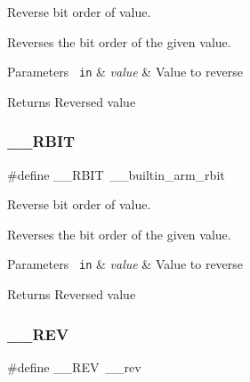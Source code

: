 Reverse bit order of value. 

Reverses the bit order of the given value. 
\begin{DoxyParams}[1]{Parameters}
\mbox{\texttt{ in}}  & {\em value} & Value to reverse \\
\hline
\end{DoxyParams}
\begin{DoxyReturn}{Returns}
Reversed value 
\end{DoxyReturn}
\mbox{\label{group___c_m_s_i_s___core___instruction_interface_gab83768933a612816fad669db5488366f}} 
\subsubsection{\texorpdfstring{\_\_RBIT}{\_\_RBIT}\hspace{0.1cm}{\footnotesize\ttfamily [2/2]}}
{\footnotesize\ttfamily \#define \+\_\+\+\_\+\+R\+B\+IT~\+\_\+\+\_\+builtin\+\_\+arm\+\_\+rbit}



Reverse bit order of value. 

Reverses the bit order of the given value. 
\begin{DoxyParams}[1]{Parameters}
\mbox{\texttt{ in}}  & {\em value} & Value to reverse \\
\hline
\end{DoxyParams}
\begin{DoxyReturn}{Returns}
Reversed value 
\end{DoxyReturn}
\mbox{\label{group___c_m_s_i_s___core___instruction_interface_ga14f54807872c0f5e05604c4924abfdae}} 
\subsubsection{\texorpdfstring{\_\_REV}{\_\_REV}\hspace{0.1cm}{\footnotesize\ttfamily [1/3]}}
{\footnotesize\ttfamily \#define \+\_\+\+\_\+\+R\+EV~\+\_\+\+\_\+rev}



